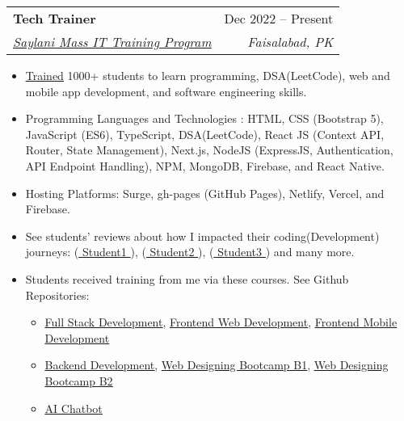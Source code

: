 \documentclass[letterpaper,11pt]{article}
\makeatletter
\newcommand{\resumeItem}[1]{
  \item\small{
    {#1 \vspace{-2pt}}
  }
}
\newcommand{\resumeSubheading}[4]{
  \vspace{-2pt}\item
    \begin{tabular*}{0.97\textwidth}[t]{l@{\extracolsep{\fill}}r}
      \textbf{#1} & #2 \\
      \textit{\small#3} & \textit{\small #4} \\
    \end{tabular*}\vspace{-7pt}
}
\newcommand{\resumeItemListStart}{\begin{itemize}}
\newcommand{\resumeItemListEnd}{\end{itemize}\vspace{-5pt}}
\makeatother
\begin{document}
\resumeSubheading
{Tech Trainer}{Dec 2022 -- Present}
{{\href{https://saylaniwelfareusa.com/en/services/education/technical-education/saylani-mass-it-training}{\underline{Saylani Mass IT Training Program}}}}{Faisalabad, PK}
\resumeItemListStart
\resumeItem{{\href{https://www.linkedin.com/posts/ahmad-jajja_learn-to-code-with-activity-7151895134744256512-Dmyf?utm_source=share&utm_medium=member_desktop}{\underline{Trained}}} 1000+ students to learn programming, DSA(LeetCode), web and mobile app development, and software engineering skills.}
\resumeItem{Programming Languages and Technologies : HTML, CSS (Bootstrap 5), JavaScript (ES6), TypeScript, DSA(LeetCode), React JS (Context API, Router, State Management), Next.js, NodeJS (ExpressJS, Authentication, API Endpoint Handling), NPM, MongoDB, Firebase, and React Native.}
\resumeItem{Hosting Platforms: Surge, gh-pages (GitHub Pages), Netlify, Vercel, and Firebase.}
\resumeItem{See students' reviews about how I impacted their coding(Development) journeys: ({\href{https://www.linkedin.com/posts/hassan-gulzar-256292267_javascript-problemsolvingskills-activity-7092472595249270784-PFDk?utm_source=share&utm_medium=member_desktop}{\underline{ Student1 }}}), ({\href{https://www.linkedin.com/posts/arhamansari12_nodejs-expressjs-mongodb-activity-7137844125382418432-SBrL?utm_source=share&utm_medium=member_desktop}{\underline{ Student2 }}}), ({\href{https://www.linkedin.com/feed/update/urn:li:activity:7171897869098962944/}{\underline{ Student3 }}}) and many more. }
\resumeItem{Students received training from me via these courses. See Github Repositories:}
\begin{itemize}
  \item {\href{https://github.com/Ahmadjajja/SMIT-Web-and-Mobile-Batch7}{\underline{Full Stack Development}}, \hspace{8pt} \href{https://github.com/Ahmadjajja/SMIT-WMA-6-A-E}{\underline{Frontend Web Development}}, \hspace{8pt} \href{https://github.com/Ahmadjajja/Mobile_Application_Development}{\underline{Frontend Mobile Development }}}
  \item {\href{https://github.com/Ahmadjajja/Backend_Development.git}{\underline{Backend Development}}, \hspace{12pt} \href{https://github.com/Ahmadjajja/Web_Designing_Crash_Course_A}{\underline{Web Designing Bootcamp B1}}, \hspace{6pt} \href{https://github.com/Ahmadjajja/Web_Designing_Crash_Course_B}{\underline{Web Designing Bootcamp B2}}}
  \item {\href{https://github.com/Ahmadjajja/AI-Chatbot}{\underline{AI Chatbot}}}
\end{itemize}
\resumeItemListEnd
\end{document}
